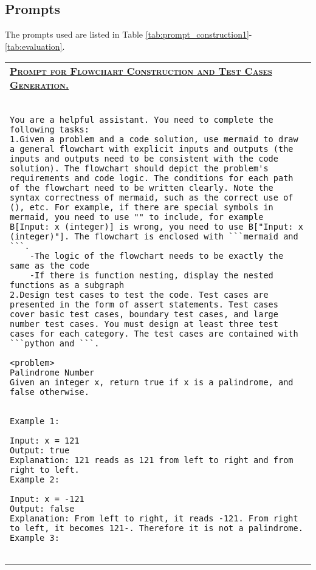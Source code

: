 \subsection{Prompts}
\label{sec:prompt}
The prompts used are listed in Table \ref{tab:prompt_construction1}-\ref{tab:evaluation}.
\begin{table*}[htbp]
\centering
\captionsetup{justification=centering}
\begin{tabular}{p{\textwidth}}
\toprule
\underline{\textbf{\textsc{Prompt for Flowchart Construction and Test Cases Generation.}}} \\
\begin{minipage}{\textwidth}
\vspace{2mm}
\begin{verbatim}

You are a helpful assistant. You need to complete the following tasks:
1.Given a problem and a code solution, use mermaid to draw a general flowchart with explicit inputs and outputs (the inputs and outputs need to be consistent with the code solution). The flowchart should depict the problem's requirements and code logic. The conditions for each path of the flowchart need to be written clearly. Note the syntax correctness of mermaid, such as the correct use of (), etc. For example, if there are special symbols in mermaid, you need to use "" to include, for example B[Input: x (integer)] is wrong, you need to use B["Input: x (integer)"]. The flowchart is enclosed with ```mermaid and ```.
    -The logic of the flowchart needs to be exactly the same as the code
    -If there is function nesting, display the nested functions as a subgraph
2.Design test cases to test the code. Test cases are presented in the form of assert statements. Test cases cover basic test cases, boundary test cases, and large number test cases. You must design at least three test cases for each category. The test cases are contained with ```python and ```.

<problem>
Palindrome Number
Given an integer x, return true if x is a palindrome, and false otherwise.


Example 1:

Input: x = 121
Output: true
Explanation: 121 reads as 121 from left to right and from right to left.
Example 2:

Input: x = -121
Output: false
Explanation: From left to right, it reads -121. From right to left, it becomes 121-. Therefore it is not a palindrome.
Example 3:


\end{verbatim}
\end{minipage}
\end{tabular}
\end{table*}
